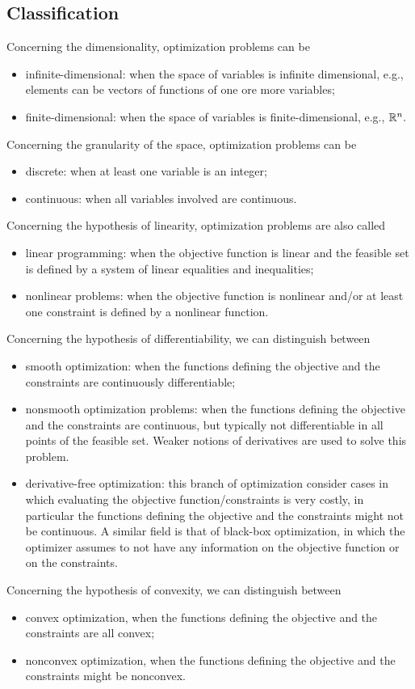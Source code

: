 \documentclass[10pt,a4paper]{article}
\begin{document}
\subsection{Classification}
Concerning the dimensionality, optimization problems can be 
\begin{itemize}
	\item infinite-dimensional: when the space of variables is infinite dimensional, e.g., elements can be vectors of functions of one ore more variables;
	\item finite-dimensional: when the space of variables is finite-dimensional, e.g., $\mathbb{R}^n.$
\end{itemize}
Concerning the granularity of the space, optimization problems can be 
\begin{itemize}
	\item discrete: when at least one variable is an integer;
	\item continuous: when all variables involved are continuous.
\end{itemize}
Concerning the hypothesis of linearity, optimization problems are also called
\begin{itemize}
\item linear programming: when the objective function is linear and the
feasible set is defined by a system of linear equalities and inequalities;
\item nonlinear problems: when the objective function is nonlinear
and/or at least one constraint is defined by a nonlinear function.
\end{itemize}
Concerning the hypothesis of differentiability, we can distinguish between
\begin{itemize}
\item smooth optimization: when the functions defining the objective
and the constraints are continuously differentiable;
\item nonsmooth optimization problems: when the functions defining the objective and the constraints are continuous, but typically not differentiable in all points of the feasible set. Weaker notions of derivatives are used to solve this problem.
\item derivative-free optimization: this branch of optimization consider cases in which evaluating the objective function/constraints is very costly, in particular the functions defining the objective and the constraints might not be continuous. A similar field is that of black-box optimization, in which the optimizer assumes to not have any information on the objective function or on the constraints.
\end{itemize}
Concerning the hypothesis of convexity, we can distinguish between
\begin{itemize}
	\item convex optimization, when the functions defining the objective and the constraints are all convex;
	\item nonconvex optimization, when the functions defining the objective and the constraints might be nonconvex.
\end{itemize}
\end{document}
